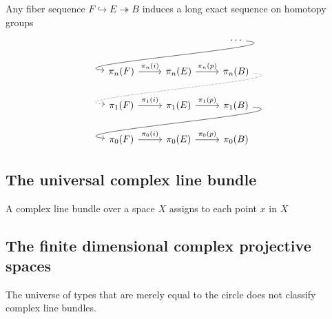 \begin{thm}
Any fiber sequence $F\hookrightarrow E\twoheadrightarrow B$ induces a long exact sequence on homotopy groups
\begin{equation*}
\begin{tikzcd}
& & \cdots \arrow[out=355,in=175,dll] \\
\pi_n(F) \arrow[r,"\pi_n(i)"] & \pi_n(E) \arrow[r,"\pi_n(p)"] & \pi_n(B) \arrow[out=355,in=175,dll,densely dotted] \\
\pi_1(F) \arrow[r,"\pi_1(i)"] & \pi_1(E) \arrow[r,"\pi_1(p)"] & \pi_1(B) \arrow[out=355,in=175,dll] \\
\pi_0(F) \arrow[r,"\pi_0(i)"] & \pi_0(E) \arrow[r,"\pi_0(p)"] & \pi_0(B)
\end{tikzcd}
\end{equation*}
\end{thm}

\subsection{The universal complex line bundle}

A complex line bundle over a space $X$ assigns to each point $x$ in $X$ 

\subsection{The finite dimensional complex projective spaces}

\begin{rmk}
  The universe of types that are merely equal to the circle does not classify complex line bundles.
\end{rmk}

\begin{thm}
  
\end{thm}



